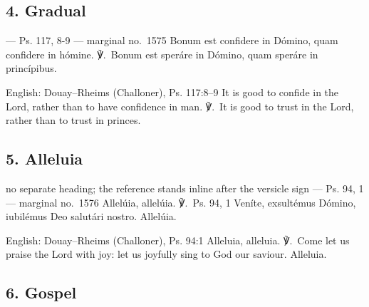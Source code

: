 \elementguard
\subsection*{4. Gradual }

\begin{appointedlatin}{ --- Ps. 117, 8-9 --- marginal no.\ 1575}
Bonum est confidere in Dómino, quam confidere in hómine. ℣.~Bonum est speráre
in Dómino, quam speráre in princípibus.
\end{appointedlatin}

\begin{namedtranslation}{English: Douay--Rheims (Challoner), Ps. 117:8--9}
It is good to confide in the Lord, rather than to have confidence in man.
℣.~It is good to trust in the Lord, rather than to trust in princes.
\end{namedtranslation}

\elementguard
\subsection*{5. Alleluia }

\begin{appointedlatin}{no separate heading; the reference stands inline after the versicle sign --- Ps. 94, 1 --- marginal no.\ 1576}
Allelúia, allelúia. ℣.~\textnormal{Ps. 94, 1} Veníte, exsultémus Dómino,
iubilémus Deo salutári nostro. Allelúia.
\end{appointedlatin}

\begin{namedtranslation}{English: Douay--Rheims (Challoner), Ps. 94:1}
Alleluia, alleluia. ℣.~Come let us praise the Lord with joy: let us joyfully
sing to God our saviour. Alleluia.
\end{namedtranslation}

\elementguard
\subsection*{6. Gospel }

